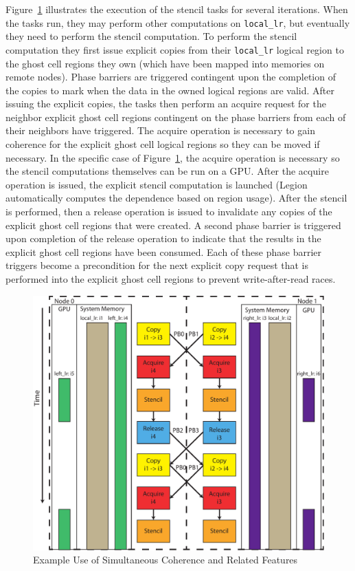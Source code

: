 Figure~\ref{fig:stencilex} illustrates the execution of 
the stencil tasks for several iterations. When the tasks run, 
they may perform other computations on {\tt local\_lr}, but 
eventually they need to perform the stencil computation. To 
perform the stencil computation they first issue explicit
copies from their {\tt local\_lr} logical region to the 
ghost cell regions they own (which have been mapped into
memories on remote nodes). Phase barriers are triggered
contingent upon the completion of the copies to mark when
the data in the owned logical regions are valid. After
issuing the explicit copies, the tasks then perform an 
acquire request for the neighbor explicit ghost cell
regions contingent on the phase barriers from each
of their neighbors have triggered. The acquire operation
is necessary to gain coherence for the explicit ghost
cell logical regions so they can be moved if necessary.
In the specific case of Figure~\ref{fig:stencilex}, 
the acquire operation is necessary so the stencil 
computations themselves can be run on a GPU. After the
acquire operation is issued, the explicit stencil 
computation is launched (Legion automatically computes
the dependence based on region usage). After the 
stencil is performed, then a release operation is
issued to invalidate any copies of the explicit ghost
cell regions that were created. A second phase barrier
is triggered upon completion of the release operation 
to indicate that the results in the explicit ghost cell
regions have been consumed. Each of these phase barrier
triggers become a precondition for the next explicit copy 
request that is performed into the explicit ghost cell
regions to prevent write-after-read races.

\begin{figure}
\centering
\includegraphics[scale=0.70]{figs/PhaseBarrier.pdf}
\caption{Example Use of Simultaneous Coherence and Related Features\label{fig:stencilex}}
\end{figure}

